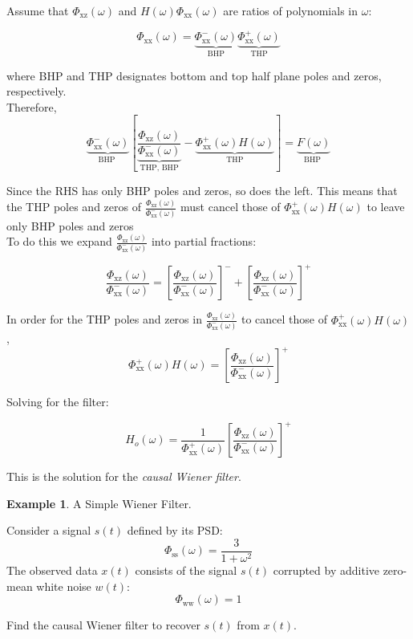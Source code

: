 \documentclass[12pt]{book}
\theoremstyle{definition}
\newtheorem{exmp}{Example}[chapter]
\begin{document}
Assume that $\Phi_\mathrm{xz}(\omega)$ and  $H(\omega)\Phi_\mathrm{xx}(\omega)$ are ratios of polynomials in $\omega$:

\[
\Phi_\mathrm{xx}(\omega) =  \underbrace{\Phi_\mathrm{xx}^-(\omega)}_{\text{BHP}}\underbrace{\Phi_\mathrm{xx}^+(\omega)}_{\text{THP}}
\]

where BHP and THP designates bottom and top half plane poles and zeros, respectively.\\

Therefore,
\[
\underbrace{\Phi_\mathrm{xx}^-(\omega)}_\text{BHP } \left [\underbrace{\frac{\Phi_\mathrm{xz}(\omega)}{\Phi_\mathrm{xx}^-(\omega)}}_\text{THP, BHP} - \underbrace{\Phi_\mathrm{xx}^+(\omega) H(\omega)}_\text{THP}\right ] = \underbrace{F(\omega)}_\text{BHP } 
\]

Since the RHS has only BHP poles and zeros, so does the left. This means that the THP poles and zeros of $\frac{\Phi_\mathrm{xz}(\omega)}{\Phi_\mathrm{xx}^-(\omega)}$ must cancel those of $\Phi_\mathrm{xx}^+(\omega) H(\omega)$ to leave only BHP poles and zeros\\

To do this we expand $\frac{\Phi_\mathrm{xz}(\omega)}{\Phi_\mathrm{xx}^-(\omega)}$ into partial fractions:

\[
\frac{\Phi_\mathrm{xz}(\omega)}{\Phi_\mathrm{xx}^-(\omega)} = \left [\frac{\Phi_\mathrm{xz}(\omega)}{\Phi_\mathrm{xx}^-(\omega)} \right ]^- +  \left [\frac{\Phi_\mathrm{xz}(\omega)}{\Phi_\mathrm{xx}^-(\omega)} \right ]^+
\]

In order for the THP poles and zeros in $\frac{\Phi_\mathrm{xz}(\omega)}{\Phi_\mathrm{xx}^-(\omega)}$ to cancel those of $\Phi_\mathrm{xx}^+(\omega) H(\omega)$, 
\[
\Phi_\mathrm{xx}^+(\omega) H(\omega) = \left [\frac{\Phi_\mathrm{xz}(\omega)}{\Phi_\mathrm{xx}^-(\omega)} \right ]^+
\]

Solving for the filter:

\[
\boxed{H_o(\omega) = \frac{1}{\Phi_\mathrm{xx}^+(\omega) }\left [\frac{\Phi_\mathrm{xz}(\omega)}{\Phi_\mathrm{xx}^-(\omega)} \right ]^+}
\]

This is the solution for the \emph{causal Wiener filter}.

\bigskip

\begin{tcolorbox}
\begin{exmp}{A Simple Wiener Filter.}
\end{exmp}

Consider a signal \(s(t)\) defined by its PSD:
\[\Phi_\mathrm{ss}(\omega) = \frac{3}{1+\omega^2}
\]
The observed data \(x(t)\) consists of the signal \(s(t)\) corrupted by additive zero-mean white noise \(w(t)\):
\[
\Phi_\mathrm{ww}(\omega) = 1
\]

Find the causal Wiener filter to recover \(s(t)\) from \(x(t)\).
\end{tcolorbox}
\end{document}
